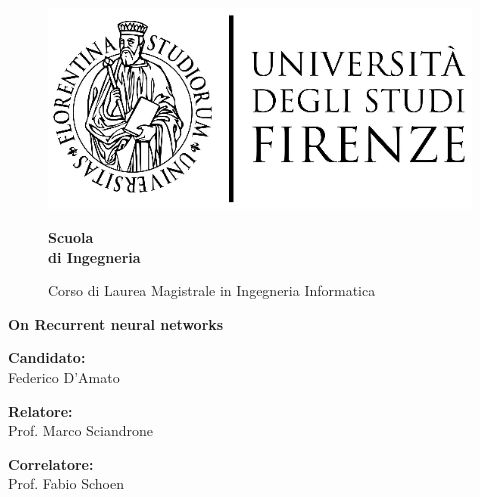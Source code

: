 \onehalfspacing
\begin{figure}[htbp]
\begin{minipage}{0.3\textwidth}
\centering
\includegraphics[scale=0.8]{logo_universita.eps}
\end{minipage}
\hspace{0.3\textwidth}
\begin{minipage}{0.4\textwidth}
\centering
\begin{flushright}
{\Large \textbf{Scuola\\
 di Ingegneria \\}
}
\end{flushright}
\begin{flushright}
Corso di Laurea Magistrale in Ingegneria Informatica
\end{flushright}
\end{minipage}

\end{figure}


\vspace{15mm}
\begin{center}

\vspace{10mm} 
 {\huge {\bf On Recurrent neural networks}
 }

\end{center}
\vspace{65mm}

\noindent
{\Large \textbf{Candidato:}}\\
\noindent
{\LARGE Federico D'Amato\\}

\noindent
\begin{minipage}{0.5\textwidth}
{\Large \textbf{Relatore:}\\}
{\LARGE Prof. Marco Sciandrone
}
\end{minipage}
\begin{minipage}{0.5\textwidth}
\begin{flushright}
{\Large \textbf{Correlatore:}\\}
{\LARGE Prof. Fabio Schoen}
\end{flushright}
\end{minipage}
\vfill
{}